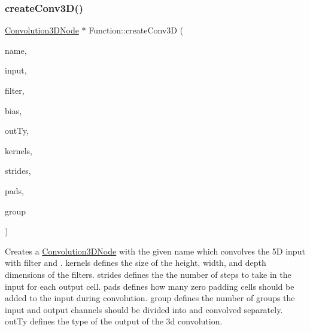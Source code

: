 \subsubsection{\texorpdfstring{create\+Conv3\+D()}{createConv3D()}\hspace{0.1cm}{\footnotesize\ttfamily [1/4]}}
{\footnotesize\ttfamily \hyperlink{classglow_1_1_convolution3_d_node}{Convolution3\+D\+Node} $\ast$ Function\+::create\+Conv3D (\begin{DoxyParamCaption}\item[{llvm\+::\+String\+Ref}]{name,  }\item[{\hyperlink{structglow_1_1_node_value}{Node\+Value}}]{input,  }\item[{\hyperlink{structglow_1_1_node_value}{Node\+Value}}]{filter,  }\item[{\hyperlink{structglow_1_1_node_value}{Node\+Value}}]{bias,  }\item[{\hyperlink{structglow_1_1_type}{Type\+Ref}}]{out\+Ty,  }\item[{llvm\+::\+Array\+Ref$<$ \hyperlink{namespaceglow_a0ca574644e1e42ef193a9947fb4d8911}{unsigned\+\_\+t} $>$}]{kernels,  }\item[{llvm\+::\+Array\+Ref$<$ \hyperlink{namespaceglow_a0ca574644e1e42ef193a9947fb4d8911}{unsigned\+\_\+t} $>$}]{strides,  }\item[{llvm\+::\+Array\+Ref$<$ \hyperlink{namespaceglow_a0ca574644e1e42ef193a9947fb4d8911}{unsigned\+\_\+t} $>$}]{pads,  }\item[{\hyperlink{namespaceglow_a0ca574644e1e42ef193a9947fb4d8911}{unsigned\+\_\+t}}]{group }\end{DoxyParamCaption})}

Creates a \hyperlink{classglow_1_1_convolution3_d_node}{Convolution3\+D\+Node} with the given {\ttfamily name} which convolves the 5D {\ttfamily input} with {\ttfamily filter} and . {\ttfamily kernels} defines the size of the height, width, and depth dimensions of the filters. {\ttfamily strides} defines the the number of steps to take in the input for each output cell. {\ttfamily pads} defines how many zero padding cells should be added to the input during convolution. {\ttfamily group} defines the number of groups the input and output channels should be divided into and convolved separately. {\ttfamily out\+Ty} defines the type of the output of the 3d convolution. \mbox{\label{classglow_1_1_function_a29c34498d91c08a88e7f503bcb55646d}} 
